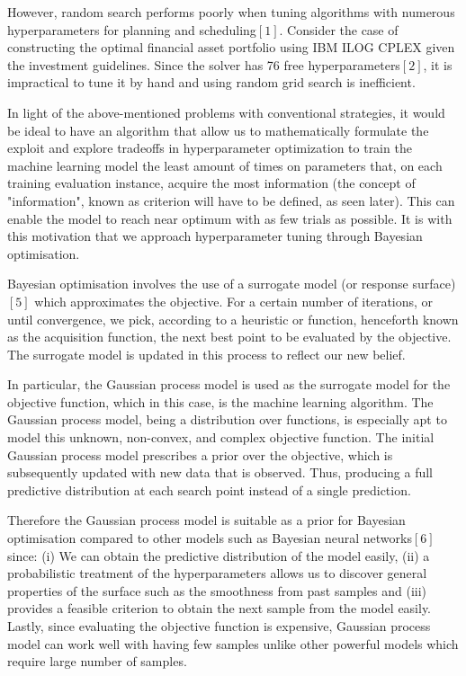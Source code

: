 \documentclass[letterpaper]{article}
\begin{document}
However, random search performs poorly when tuning algorithms with numerous hyperparameters for planning and scheduling$[1]$. Consider the case of constructing the optimal financial asset portfolio using IBM ILOG CPLEX given the investment guidelines. Since the solver has 76 free hyperparameters$[2]$, it is impractical to tune it by hand and using random grid search is inefficient.

In light of the above-mentioned problems with conventional strategies, it would be ideal
to have an algorithm that allow us to mathematically formulate the exploit and explore
tradeoffs in hyperparameter optimization to train the machine learning model the least
amount of times on parameters that, on each training evaluation instance, acquire the
most information (the concept of "information", known as criterion will have to be defined,
as seen later). This can enable the model to reach near optimum with as few trials as possible.
It is with this motivation that we approach hyperparameter tuning through Bayesian optimisation.

Bayesian optimisation involves the use of a surrogate model (or response surface)$[5]$
which approximates the objective. For a certain number of iterations, or until
convergence, we pick, according to a heuristic or function, henceforth known as the
acquisition function, the next best point to be evaluated by the objective. The
surrogate model is updated in this process to reflect our new belief.

In particular, the Gaussian process model is used as the surrogate model
for the objective function, which in this case, is the machine learning algorithm.
The Gaussian process model, being a distribution over functions, is especially apt
to model this unknown, non-convex, and complex objective function. The
initial Gaussian process model prescribes a prior over the objective, which is
subsequently updated with new data that is observed.
Thus, producing a full predictive distribution at each search point instead of a single prediction.

Therefore the Gaussian process model is suitable as a prior for Bayesian optimisation compared to other models such as Bayesian neural networks$[6]$ since: (i) We can obtain the predictive distribution of the model easily, (ii) a probabilistic treatment of the hyperparameters allows us to discover general properties of the surface such as the smoothness from past samples and (iii) provides a feasible criterion to obtain the next sample from the model easily. Lastly, since evaluating the objective function is expensive, Gaussian process model can work well with having few samples unlike other powerful models which require large number of samples.
\end{document}
